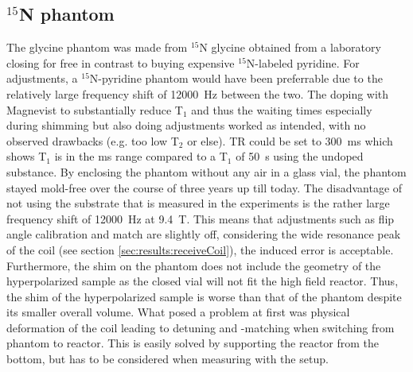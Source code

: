         \subsection{$^{15}$N phantom}
        The glycine phantom was made from $^{15}$N glycine obtained from a laboratory closing for free in contrast to buying expensive $^{15}$N-labeled pyridine. For adjustments, a $^{15}$N-pyridine phantom would have been preferrable due to the relatively large frequency shift of \SI{12000}{\hertz} between the two. The doping with Magnevist to substantially reduce T$_1$ and thus the waiting times especially during shimming but also doing adjustments worked as intended, with no observed drawbacks (e.g. too low T$_2$ or else). TR could be set to \SI{300}{\milli\second} which shows T$_1$ is in the \si{\milli\second} range compared to a T$_1$ of \SI{50}{\second} using the undoped substance.
            By enclosing the phantom without any air in a glass vial, the phantom stayed mold-free over the course of three years up till today.
            The disadvantage of not using the substrate that is measured in the experiments is the rather large frequency shift of \SI{12000}{\hertz} at \SI{9.4}{\tesla}. This means that adjustments such as flip angle calibration and match are slightly off, considering the wide resonance peak of the coil (see section \ref{sec:results:receiveCoil}), the induced error is acceptable.
            Furthermore, the shim on the phantom does not include the geometry of the hyperpolarized sample as the closed vial will not fit the high field reactor. Thus, the shim of the hyperpolarized sample is worse than that of the phantom despite its smaller overall volume.
            What posed a problem at first was physical deformation of the coil leading to detuning and -matching when switching from phantom to reactor. This is easily solved by supporting the reactor from the bottom, but has to be considered when measuring with the setup.
